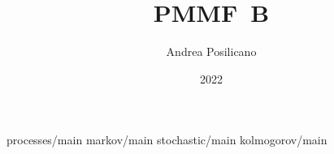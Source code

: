 \usepackage	{PMMF-style/style}

\title	{PMMF~B}
\author	{Andrea Posilicano}
\date	{2022}


\maketitle
	{processes/main}
	{markov/main}
	{stochastic/main}
\appendix
	{kolmogorov/main}

